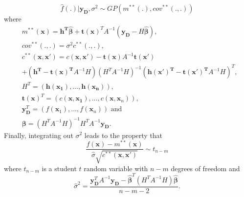 \documentclass{article}
\newcommand{\simulator}{f}
\newcommand{\emulator}{\hat{f}}
\newcommand{\inputVec}{\mathbf{x}}
\newcommand{\outputVec}{\mathbf{y}}
\newcommand{\basisFuncs}{\mathbf{h}}
\newcommand{\basisCoeffs}{\mathbf{\beta}}
\newcommand{\basisCoeffsEst}{\hat{\mathbf{\beta}}}
\newcommand{\cov}{cov}
\newcommand{\var}{\sigma^2}
\newcommand{\varEst}{\hat{\sigma}^2}
\newcommand{\numBasisFuncs}{m}
\newcommand{\corr}{c}
\newcommand{\designOutput}{\outputVec_\design}
\newcommand{\design}{\mathbf{D}}
\newcommand{\corrMatrix}{A}
\newcommand{\numDPs}{n}
\newcommand{\GP}{GP}
\newcommand{\SDEst}{\hat{\sigma}}
\begin{document}
\begin{equation}
    \nonumber
    \emulator(.) | \designOutput,\var \sim \GP(m^{**}(.),\cov^{**}(.,.))
\end{equation}
where 
\begin{align}
    & m^{**}(\inputVec) = \mathbf{\basisFuncs^T \basisCoeffsEst} + \mathbf{t(\inputVec)}^T \corrMatrix^{-1} (\designOutput - H\basisCoeffsEst),\label{eq:post2-mean} \\
    & \cov^{**}(.,.) = \var \corr^{**}(.,.),\nonumber \\
    & \corr^{**}(\inputVec,\inputVec') = \corr(\inputVec,\inputVec') - \mathbf{t(\inputVec)} \corrMatrix^{-1} \mathbf{t(\inputVec')} \label{eq:post2-cov} \\
    & + (\mathbf{\basisFuncs^T - t(\inputVec)^T}\corrMatrix^{-1}H) (H^T \corrMatrix^{-1} H)^{-1}(\mathbf{\basisFuncs(\inputVec')^T - t(\inputVec')^T}\corrMatrix^{-1}H)^T, \nonumber\\
    & H^T = (\mathbf{\basisFuncs(\inputVec_1),\dots,\basisFuncs(\inputVec_\numDPs)}),\nonumber\\
    & \mathbf{t(\inputVec)}^T = \left(\corr(\mathbf{\inputVec,\inputVec_1}),\dots,\corr(\inputVec,\inputVec_\numDPs) \right),\nonumber\\
    & \designOutput^T = \left(\simulator(\inputVec_1),\dots,\simulator(\inputVec_\numDPs) \right) \text{ and} \nonumber\\
    & \basisCoeffs = (H^T \corrMatrix^{-1} H)^{-1} H^T \corrMatrix^{-1} \designOutput. \label{eq:post2-beta}
\end{align}
Finally, integrating out $\var$ leads to the property that
\begin{equation}
    \label{eq:student t}
    \frac{\simulator(\inputVec) - m^{**}(\inputVec)}{\SDEst\sqrt{\corr^{**}(\inputVec,\inputVec')}} \sim t_{\numDPs-\numBasisFuncs}
\end{equation}
where $t_{\numDPs-\numBasisFuncs}$ is a student $t$ random variable with $\numDPs-\numBasisFuncs$ degrees of freedom and 
\begin{equation}
    \label{eq:sigma_sq_hat}
    \varEst = \frac{\designOutput^T \corrMatrix^{-1} \designOutput -\basisCoeffsEst^T (H^T \corrMatrix^{-1} H) \basisCoeffsEst}{\numDPs - \numBasisFuncs - 2}.
\end{equation}
\end{document}
